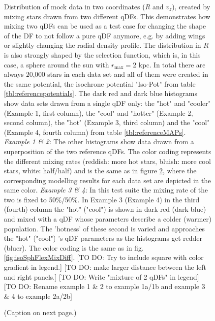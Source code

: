 

\begin{figure}
\caption{Distribution of mock data in two coordinates ($R$ and $v_z$), created by mixing stars drawn from two different qDFs. This demonstrates how mixing two qDFs can be used as a test case for changing the shape of the DF to not follow a pure qDF anymore, e.g. by adding wings or slightly changing the radial density profile. The distribution in $R$ is also strongly shaped by the selection function, which is, in this case, a sphere around the sun with $r_\text{max}=2$ kpc. In total there are always 20,000 stars in each data set and all of them were created in the same potential, the isochrone potential "Iso-Pot" from table \ref{tbl:referencepotentials}. The dark red and dark blue histograms show data sets drawn from a single qDF only: the "hot" and "cooler" \MAPs (Example 1, first column), the "cool" and "hotter" \MAPs (Example 2, second column), the "hot" (Example 3, third column) and the "cool" \MAPs (Example 4, fourth column) from table \ref{tbl:referenceMAPs}. \emph{Example 1 \& 2:} The other histograms show data drawn from a superposition of the two reference qDFs. The color coding represents the different mixing rates (reddish: more hot stars, bluish: more cool stars, white: half/half) and is the same as in figure \ref{fig:isoSphFlexMixCont}, where the corresponding modelling results for each data set are depicted in the same color. \emph{Example 3 \& 4:} In this test suite the mixing rate of the two \MAPs is fixed to 50\%/50\%. In Example 3 (Example 4) in the third (fourth) column the "hot" ("cool") \MAP is shown in dark red (dark blue) and mixed with a qDF whose parameters describe a colder (warmer) population. The 'hotness' of these second \MAP is varied and approaches the "hot" ("cool") \MAP's qDF parameters as the histograms get redder (bluer). The color coding is the same as in fig. \ref{fig:isoSphFlexMixDiff}. [TO DO: Try to include square with color gradient in legend.] [TO DO: make larger distance between the left and right panels.] [TO DO: Write "mixture of 2 qDFs" in legend] [TO DO: Rename example 1 \& 2 to example 1a/1b and example 3 \& 4 to example 2a/2b]}
\label{fig:isoSphFlexMix_mockdata}
\end{figure}


\begin{figure}
\caption{(Caption on next page.)}
\label{fig:isoSphFlexMixCont}
\end{figure}

